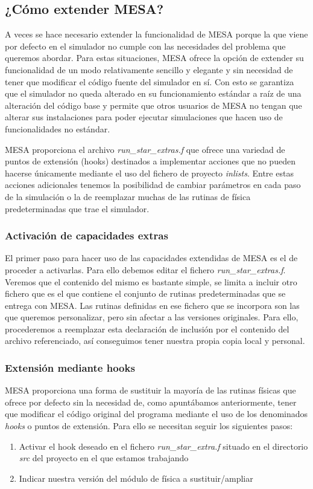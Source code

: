 \subsection{¿Cómo extender MESA?}
A veces se hace necesario extender la funcionalidad de MESA porque la que viene por defecto en el simulador no cumple con las necesidades del problema que queremos abordar. Para estas situaciones, MESA ofrece la opción de extender su funcionalidad de un modo relativamente sencillo y elegante y sin necesidad de tener que modificar el código fuente del simulador en sí. Con esto se garantiza que el simulador no queda alterado en su funcionamiento estándar a raíz de una alteración del código base y permite que otros usuarios de MESA no tengan que alterar sus instalaciones para poder ejecutar simulaciones que hacen uso de funcionalidades no estándar. \par

MESA proporciona el archivo \textit{run\_star\_extras.f} que ofrece una variedad de puntos de extensión (hooks) destinados a implementar acciones que no pueden hacerse únicamente mediante el uso del fichero de proyecto \textit{inlists}. Entre estas acciones adicionales tenemos la posibilidad de cambiar parámetros en cada paso de la simulación o la de reemplazar muchas de las rutinas de física predeterminadas que trae el simulador.\par

\subsubsection{Activación de capacidades extras}
El primer paso para hacer uso de las capacidades extendidas de MESA es el de proceder a activarlas. Para ello debemos editar el fichero \textit{run\_star\_extras.f}. Veremos que el contenido del mismo es bastante simple, se limita a incluir otro fichero que es el que contiene el conjunto de rutinas predeterminadas que se entrega con MESA. Las rutinas definidas en ese fichero que se incorpora son las que queremos personalizar, pero sin afectar a las versiones originales. Para ello, procederemos a reemplazar esta declaración de inclusión por el contenido del archivo referenciado, así conseguimos tener nuestra propia copia local y personal.\par

\subsubsection{Extensión mediante hooks}
MESA proporciona una forma de sustituir la mayoría de las rutinas físicas que ofrece por defecto sin la necesidad de, como apuntábamos anteriormente, tener que modificar el código original del programa mediante el uso de los denominados \textit{hooks} o puntos de extensión. Para ello se necesitan seguir los siguientes pasos:
\begin{enumerate}
    \item Activar el hook deseado en el fichero \textit{run\_star\_extra.f} situado en el directorio \textit{src} del proyecto en el que estamos trabajando
    \item Indicar nuestra versión del módulo de física a sustituir/ampliar
\end{enumerate}

